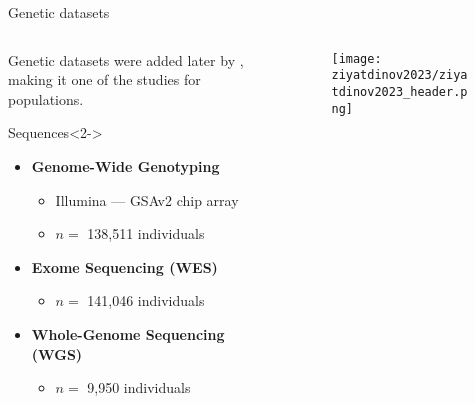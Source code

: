 \begin{frame}{Genetic datasets}

    \begin{columns}
        \begin{column}{0.45\textwidth}
            Genetic datasets were added later by \textcite{ziyatdinov2023}, making it one of the  studies for  populations.

            \begin{block}{Sequences}<2->
                \begin{itemize}
                    \item<2-> \textbf{Genome-Wide Genotyping}
                    \begin{itemize}
                        \item Illumina --- GSAv2 chip array
                        \item $n =$ 138,511 individuals
                    \end{itemize}

                    \item<3-> \textbf{Exome Sequencing (WES)}
                    \begin{itemize}
                        \item $n =$ 141,046 individuals
                    \end{itemize}

                    \item<4-> \textbf{Whole-Genome Sequencing (WGS)}
                    \begin{itemize}
                        \item $n =$ 9,950 individuals
                    \end{itemize}
                \end{itemize}
            \end{block}
        \end{column}

        \begin{column}{0.45\textwidth}
            \begin{figure}[htpb]
                \centering
                \texttt{[image: ziyatdinov2023/ziyatdinov2023\_header.png]}
            \end{figure}
        \end{column}
    \end{columns}

\end{frame}


